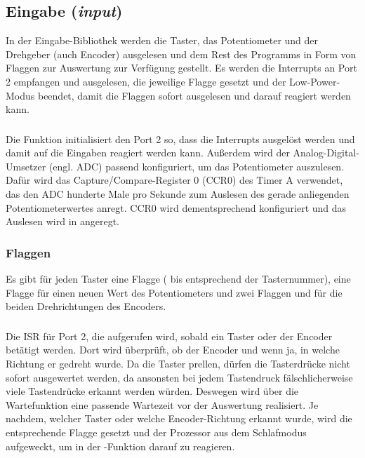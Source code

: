 \subsection{Eingabe (\emph{input})}
In der Eingabe-Bibliothek werden die Taster, das Potentiometer und der Drehgeber (auch Encoder) ausgelesen und dem Rest des Programms in Form von Flaggen zur Auswertung zur Verfügung gestellt. Es werden die Interrupts an Port 2 empfangen und ausgelesen, die jeweilige Flagge gesetzt und der Low-Power-Modus beendet, damit die Flaggen sofort ausgelesen und darauf reagiert werden kann.

\subsubsection{}
Die Funktion initialisiert den Port 2 so, dass die Interrupts ausgelöst werden und damit auf die Eingaben reagiert werden kann. Außerdem wird der Analog-Digital-Umsetzer (engl. ADC) passend konfiguriert, um das Potentiometer auszulesen. Dafür wird das Capture/Compare-Register 0 (CCR0) des Timer A verwendet, das den ADC hunderte Male pro Sekunde zum Auslesen des gerade anliegenden Potentiometerwertes anregt. CCR0 wird dementsprechend konfiguriert und das Auslesen wird in  angeregt.

\subsubsection{Flaggen}
Es gibt für jeden Taster eine Flagge ( bis  entsprechend der Tasternummer), eine Flagge  für einen neuen Wert des Potentiometers und zwei Flaggen  und  für die beiden Drehrichtungen des Encoders.

\subsubsection{}
Die ISR für Port 2, die aufgerufen wird, sobald ein Taster oder der Encoder betätigt werden. Dort wird überprüft, ob der Encoder und wenn ja, in welche Richtung er gedreht wurde. Da die Taster prellen, dürfen die Tasterdrücke nicht sofort ausgewertet werden, da ansonsten bei jedem Tastendruck fälschlicherweise viele Tastendrücke erkannt werden würden. Deswegen wird über die Wartefunktion  eine passende Wartezeit vor der Auswertung realisiert. Je nachdem, welcher Taster oder welche Encoder-Richtung erkannt wurde, wird die entsprechende Flagge gesetzt und der Prozessor aus dem Schlafmodus aufgeweckt, um in der -Funktion darauf zu reagieren.


